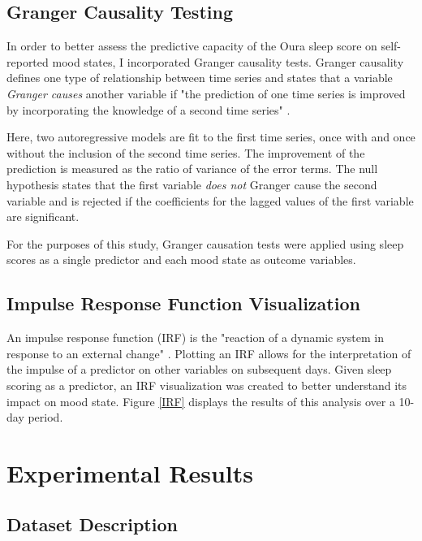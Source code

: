 \documentclass{article}
\begin{document}
\hypertarget{granger-causality}{%
\subsection{Granger Causality Testing}\label{granger-causality}}

In order to better assess the predictive capacity of the Oura sleep score on
self-reported mood states, I incorporated Granger causality tests. Granger
causality defines one type of relationship between time series
\citep{grangerInvestigating1969} and states that a variable \textit{Granger
causes} another variable if "the prediction of one time series is improved by
incorporating the knowledge of a second time series" \citep{boseVector2017}.

Here, two autoregressive models are fit to the first time series, once with and once
without the inclusion of the second time series. The improvement of the
prediction is measured as the ratio of variance of the error terms. The null
hypothesis states that the first variable \textit{does not} Granger cause the
second variable and is rejected if the coefficients for the lagged values of the
first variable are significant.

For the purposes of this study, Granger causation tests were applied using sleep
scores as a single predictor and each mood state as outcome variables.

\hypertarget{impulse-response-analysis}{%
\subsection{Impulse Response Function Visualization}\label{impulse-response-analysis}}

An impulse response function (IRF) is the "reaction of a dynamic system in
response to an external change" \citep{devriesWearableMeasured2023}. Plotting an
IRF allows for the interpretation of the impulse of a predictor on other
variables on subsequent days. Given sleep scoring as a predictor, an IRF
visualization was created to better understand its impact on mood state. Figure
\ref{IRF} displays the results of this analysis over a 10-day period.

\hypertarget{results}{%
\section{Experimental Results}\label{results}}

\hypertarget{dataset-description}{%
\subsection{Dataset Description}\label{dataset-description}}
\end{document}
